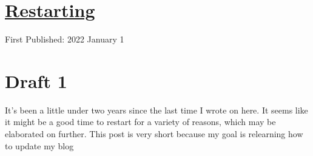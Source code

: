 \documentclass[12pt]{article}[titlepage]
\newcommand{\1}{\={a}}
\newcommand{\2}{\={e}}
\newcommand{\3}{\={\i}}
\newcommand{\4}{\=o}
\newcommand{\5}{\=u}
\newcommand{\6}{\={A}}
\renewcommand{\,}{\textsuperscript{,}}
\begin{document}
\doublespacing
\section{\href{restarting.html}{Restarting}}
First Published: 2022 January 1
\section{Draft 1}
It's been a little under two years since the last time I wrote on here.
It seems like it might be a good time to restart for a variety of reasons, which may be elaborated on further.
This post is very short because my goal is relearning how to update my blog
\end{document}
